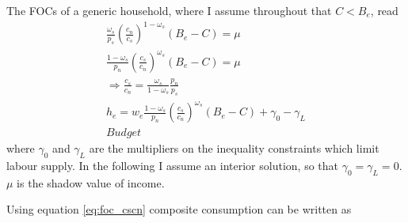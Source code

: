 \begin{comment}
\paragraph{Alternative specification: rich can choose where to work } \ar should ensure that the wage of the rich is higher than the wage paid for low-skill workers; otherwise there would be no high-skill labour supply.

The problem of a high-skill household then reads
\begin{align*}
\underset{c_n, c_s, h_e}{max}& \frac{-(C-B)^2}{2}- \frac{h_e^2}{2}\\
s.t.& \ C= c_s^{\omega_s} c_n^{1-\omega_s}\\
& c_sp_s+c_np_n=w_h n_h+w_l n_l\\
& n_h+n_l=h_e\\
& n_{-e}=0 \ if\ e=l\\
& h_e\in\{0,L\}.
\end{align*}

content...
\end{comment}

The FOCs of a generic household, where I  assume throughout that $C<B_e$, read
\begin{align}
\frac{\omega_s}{p_s}\left(\frac{c_n}{c_s}\right)^{1-\omega_s}\left(B_e-C\right)=\mu\\
\frac{1-\omega_s}{p_n}\left(\frac{c_s}{c_n}\right)^{\omega_s}\left(B_e-C\right)=\mu\\
\Rightarrow \frac{c_s}{c_n}=\frac{\omega_s}{1-\omega_s}\frac{p_n}{p_s}\label{eq:foc_cscn}\\
h_e=w_e\frac{1-\omega_s}{p_n}\left(\frac{c_s}{c_n}\right)^{\omega_s}\left(B_e-C\right) +\gamma_0 -\gamma_L\\
Budget
\end{align} 
where $\gamma_0$ and $\gamma_L$ are the multipliers on the inequality constraints which limit labour supply. In the following I assume an interior solution, so that $\gamma_0=\gamma_L=0$. 
$\mu$ is the shadow value of income. 

Using equation \ref{eq:foc_cscn} composite consumption can be written as 

